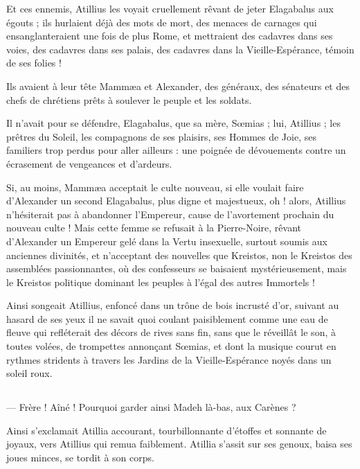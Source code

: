 \documentclass[a4paper, 11pt, oneside, polutonikogreek, french]{article}
\begin{document}
Et ces ennemis, Atillius les voyait cruellement rêvant de jeter Elagabalus aux égouts ; ils hurlaient déjà des mots de mort, des menaces de carnages qui ensanglanteraient une fois de plus Rome, et mettraient des cadavres dans ses voies, des cadavres dans ses palais, des cadavres dans la Vieille-Espérance, témoin de ses folies !

Ils avaient à leur tête Mammæa et Alexander, des généraux, des sénateurs et des chefs de chrétiens prêts à soulever le peuple et les soldats.

Il n'avait pour se défendre, Elagabalus, que sa mère, Sœmias ; lui, Atillius ; les prêtres du Soleil, les compagnons de ses plaisirs, ses Hommes de Joie, ses familiers trop perdus pour aller ailleurs : une poignée de dévouements contre un écrasement de vengeances et d'ardeurs.

Si, au moins, Mammæa acceptait le culte nouveau, si elle voulait faire d'Alexander un second Elagabalus, plus digne et majestueux, oh ! alors, Atillius n'hésiterait pas à abandonner l'Empereur, cause de l'avortement prochain du nouveau culte ! Mais cette femme se refusait à la Pierre-Noire, rêvant d'Alexander un Empereur gelé dans la Vertu insexuelle, surtout soumis aux anciennes divinités, et n'acceptant des nouvelles que Kreistos, non le Kreistos des assemblées passionnantes, où des confesseurs se baisaient mystérieusement, mais le Kreistos politique dominant les peuples à l'égal des autres Immortels !

Ainsi songeait Atillius, enfoncé dans un trône de bois incrusté d'or, suivant au hasard de ses yeux il ne savait quoi coulant paisiblement comme une eau de fleuve qui refléterait des décors de rives sans fin, sans que le réveillât le son, à toutes volées, de trompettes annonçant Sœmias, et dont la musique courut en rythmes stridents à travers les Jardins de la Vieille-Espérance noyés dans un soleil roux.
\clearpage
\subsection{}
\paragraph{}
--- Frère ! Aîné ! Pourquoi garder ainsi Madeh là-bas, aux Carènes ?

Ainsi s'exclamait Atillia accourant, tourbillonnante d'étoffes et sonnante de joyaux, vers Atillius qui remua faiblement. Atillia s'assit sur ses genoux, baisa ses joues minces, se tordit à son corps.
\end{document}
